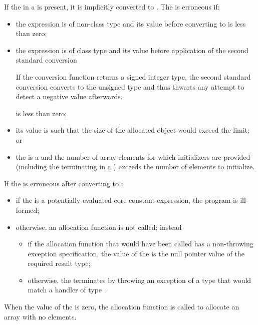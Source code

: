 \pnum
{}%
If the  in a 
is present, it is implicitly converted to .
%
The  is erroneous if:
\begin{itemize}
\item
the expression is of non-class type and its value before converting to
 is less than zero;

\item
the expression is of class type and its value before application of the second
standard conversion
\begin{footnote}
If the conversion function
returns a signed integer type, the second standard conversion converts to the
unsigned type  and thus thwarts any attempt to detect a
negative value afterwards.
\end{footnote}
is less than zero;

\item
its value is such that the size of the allocated object would exceed the
 limit; or

\item
the  is a  and the
number of array elements for which initializers are provided (including the
terminating  in a ) exceeds the
number of elements to initialize.
\end{itemize}

If the  is erroneous after converting to :
\begin{itemize}
\item
if the  is a potentially-evaluated core constant expression,
the program is ill-formed;
\item
otherwise, an allocation function is not called; instead
\begin{itemize}
\item
if the allocation function that would have been called
has a non-throwing exception specification,
the value of the 
is the null pointer value of the required result type;
\item
otherwise, the  terminates by throwing an
exception of a type that would match a handler of type
.
\end{itemize}
\end{itemize}
When the value of the  is zero, the allocation
function is called to allocate an array with no elements.

